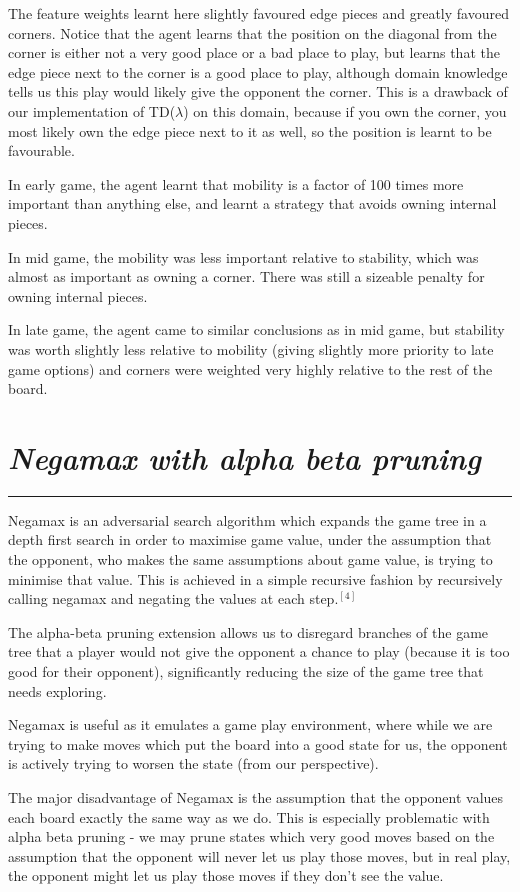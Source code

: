 \documentclass[10pt]{report}
\begin{document}
\begin{multicols}{2}
The feature weights learnt here slightly favoured edge pieces and greatly favoured corners. Notice that the agent learns that the position on the diagonal from the corner is either not a very good place or a bad place to play, but learns that the edge piece next to the corner is a good place to play, although domain knowledge tells us this play would likely give the opponent the corner. This is a drawback of our implementation of TD($\lambda$) on this domain, because if you own the corner, you most likely own the edge piece next to it as well, so the position is learnt to be favourable.

In early game, the agent learnt that mobility is a factor of 100 times more important than anything else, and learnt a strategy that avoids owning internal pieces.

In mid game, the mobility was less important relative to stability, which was almost as important as owning a corner. There was still a sizeable penalty for owning internal pieces.

In late game, the agent came to similar conclusions as in mid game, but stability was worth slightly less relative to mobility (giving slightly more priority to late game options) and corners were weighted very highly relative to the rest of the board.

\section*{\emph{Negamax with alpha beta pruning}}
\hrule

Negamax is an adversarial search algorithm which expands the game tree in a depth first search in order to maximise game value, under the assumption that the opponent, who makes the same assumptions about game value, is trying to minimise that value. This is achieved in a simple recursive fashion by recursively calling negamax and negating the values at each step.$^{[4]}$

The alpha-beta pruning extension allows us to disregard branches of the game tree that a player would not give the opponent a chance to play (because it is too good for their opponent), significantly reducing the size of the game tree that needs exploring.

Negamax is useful as it emulates a game play environment, where while we are trying to make moves which put the board into a good state for us, the opponent is actively trying to worsen the state (from our perspective).

The major disadvantage of Negamax is the assumption that the opponent values each board exactly the same way as we do. This is especially problematic with alpha beta pruning - we may prune states which very good moves based on the assumption that the opponent will never let us play those moves, but in real play, the opponent might let us play those moves if they don't see the value.
\columnbreak

\end{multicols}
\end{document}

